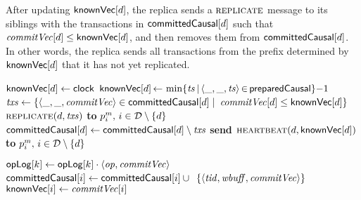 After updating ${\sf knownVec}[d]$, the replica sends a $\textsc{replicate}$
message to its siblings with the transactions in ${\sf committedCausal}[d]$ such that
$\commitvector[d]\leq\replicavectorclock[d]$, and then removes them from
${\sf committedCausal}[d]$. In other words, the replica sends all transactions from the
prefix determined by ${\sf knownVec}[d]$ that it has not yet replicated.

\begin{algorithm}[t]
  \renewcommand{\SpaceHandler}{\vspace{6pt}}
  \begin{algorithmic}[1]
    \small
    \Function{\PROPAGATELOCAL}{$ $} \label{line:replicatelocal}

        \If{$\preparedblue = \emptyset$}
        ${\sf knownVec}[d] \gets {\sf clock}$\label{line:updateknownvc-start}
          \Else {}
          $\replicavectorclock[d] \,{\gets}\, \min\{\ts \,{\mid}\,
          \langle \_,\_, \ts\rangle\,{\in}\,\preparedblue\}{-}1$\label{line:localknownprepared}
          \EndIf
           $\atxs \gets \{\langle \_, \_, \commitvector\rangle
          \in \committedset[d] \mid $
          \Statex \hspace{3.7cm} $\commitvector[d]\leq\replicavectorclock[d]\}$
          \If{$\atxs \neq \emptyset$}
                $\REPLICATE(d, \atxs)$
                \textbf{to} $\partition^m_i,\, i \in \DC \setminus \{d\}$
                \State $\committedset[d] \gets \committedset[d]\setminus \atxs$
          \Else{}
          {\bf send}
              $\textsc{heartbeat}(d, {\sf knownVec}[d])$
              \textbf{to} $\partition^m_i,\, i \in \DC \setminus \{d\}$\!\!\!\!\label{line:updateknownprepared}
          \EndIf
    \EndFunction

    \SpaceHandler

  \label{line:receivereplicate}
      \If{$\commitvector[i]>\replicavectorclock[i]$}\label{line:receivepreparedprecondition}
        \State $\store[k] \gets \store[k] \cdot
          \langle \op, \commitvector \rangle$
      \EndFor
      \State ${\sf committedCausal}[i] \gets {\sf committedCausal}[i] \cup {}$
        \Statex\hspace{4.6cm}$
        \{\langle \tx, \aws, \commitvector\rangle\}$
       \State $\replicavectorclock[i] \gets \commitvector[i]$
       \EndIf
       \EndFor
    \EndWhenRcv


\end{algorithmic}
\end{algorithm}
